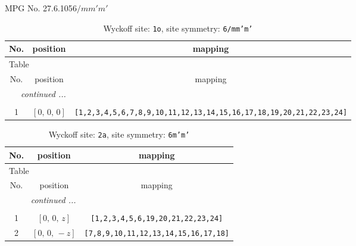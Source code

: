 \documentclass[fleqn,8pt]{jsarticle}
\begin{document}
\setcounter{MaxMatrixCols}{32}

\renewcommand{\tablename}{Table~}
\renewcommand{\figurename}{Figure~}
\begin{center}
\LARGE
MPG No. 27.6.105\quad$6/mm'm'$
\end{center}
\renewcommand{\arraystretch}{1.2}
\begin{longtable}{ccc}
\caption{Wyckoff site: {\tt 1o}, site symmetry: {\tt 6/mm'm'}}
 \\
 \hline \hline
No. & position & mapping \\ \hline \endfirsthead

\multicolumn{2}{l}{\tablename\ \thetable{}} \\
 \hline \hline
No. & position & mapping \\ \hline \endhead

 \hline \hline
\multicolumn{2}{r}{\footnotesize\it continued ...} \\ \endfoot

 \hline \hline
\multicolumn{2}{r}{} \\ \endlastfoot

1 & $\left[ 0,\, 0,\, 0 \right]$ & {\tt [1,2,3,4,5,6,7,8,9,10,11,12,13,14,15,16,17,18,19,20,21,22,23,24]} \\
\end{longtable}
\renewcommand{\arraystretch}{1.2}
\begin{longtable}{ccc}
\caption{Wyckoff site: {\tt 2a}, site symmetry: {\tt 6m'm'}}
 \\
 \hline \hline
No. & position & mapping \\ \hline \endfirsthead

\multicolumn{2}{l}{\tablename\ \thetable{}} \\
 \hline \hline
No. & position & mapping \\ \hline \endhead

 \hline \hline
\multicolumn{2}{r}{\footnotesize\it continued ...} \\ \endfoot

 \hline \hline
\multicolumn{2}{r}{} \\ \endlastfoot

1 & $\left[ 0,\, 0,\, z \right]$ & {\tt [1,2,3,4,5,6,19,20,21,22,23,24]} \\ \hline
2 & $\left[ 0,\, 0,\, - z \right]$ & {\tt [7,8,9,10,11,12,13,14,15,16,17,18]} \\
\end{longtable}
\renewcommand{\arraystretch}{1.2}
\end{document}
